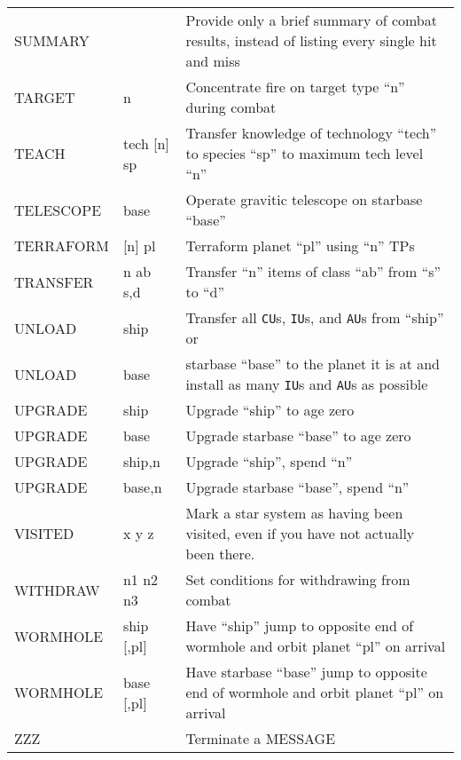 \documentclass[10pt,titlepage]{article}
\begin{document}
\begin{longtable}{|llp{9cm}|}
SUMMARY   &                  &    Provide only a brief summary of combat results, instead of listing every single hit and miss \\
TARGET   &       n           &    Concentrate fire on target type ``n'' during combat \\
TEACH   &        tech [n] sp &    Transfer knowledge of technology ``tech'' to species ``sp'' to maximum tech level ``n'' \\
TELESCOPE  &     base       &     Operate gravitic telescope on starbase ``base'' \\
TERRAFORM  &     [n] pl     &     Terraform planet ``pl'' using ``n'' TPs \\
TRANSFER   &     n ab s,d   &     Transfer ``n'' items of class ``ab'' from ``s'' to ``d'' \\
UNLOAD    &      ship       &     Transfer all \texttt{CU}s, \texttt{IU}s, and \texttt{AU}s from ``ship'' or \\
UNLOAD    &      base       &     starbase ``base'' to the planet it is at and install as many \texttt{IU}s and \texttt{AU}s as possible \\
UPGRADE   &      ship       &     Upgrade ``ship'' to age zero \\
UPGRADE   &      base       &     Upgrade starbase ``base'' to age zero \\
UPGRADE   &      ship,n     &     Upgrade ``ship'', spend ``n'' \\
UPGRADE   &      base,n     &     Upgrade starbase ``base'', spend ``n'' \\
VISITED   &      x y z      &     Mark a star system as having been visited, even if you have not actually been there. \\
WITHDRAW   &     n1 n2 n3    &    Set conditions for withdrawing from combat \\
WORMHOLE   &     ship [,pl]  &    Have ``ship'' jump to opposite end of wormhole and orbit planet ``pl'' on arrival \\
WORMHOLE   &     base [,pl] &     Have starbase ``base'' jump to opposite end of wormhole and orbit planet ``pl'' on arrival \\
ZZZ       &                  &    Terminate a MESSAGE \\
\hline
\end{longtable}
\end{document}
